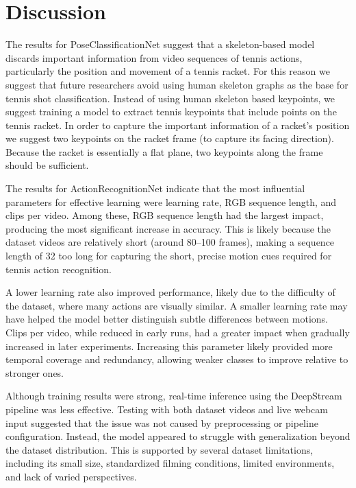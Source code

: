 \documentclass[pdflatex,sn-mathphys-num]{sn-jnl}%
\theoremstyle{thmstyleone}%
\theoremstyle{thmstyletwo}%
\theoremstyle{thmstylethree}%
\begin{document}


\section{Discussion}\label{sec5}

The results for PoseClassificationNet suggest that a skeleton-based model discards important information from video sequences of tennis actions, particularly the position and movement of a tennis racket. For this reason we suggest that future researchers avoid using human skeleton graphs as the base for tennis shot classification. Instead of using human skeleton based keypoints, we suggest training a model to extract tennis keypoints that include points on the tennis racket. In order to capture the important information of a racket's position we suggest two keypoints on the racket frame (to capture its facing direction). Because the racket is essentially a flat plane, two keypoints along the frame should be sufficient. 

The results for ActionRecognitionNet indicate that the most influential parameters for effective learning were learning rate, RGB sequence length, and clips per video. Among these, RGB sequence length had the largest impact, producing the most significant increase in accuracy. This is likely because the dataset videos are relatively short (around 80–100 frames), making a sequence length of 32 too long for capturing the short, precise motion cues required for tennis action recognition.

A lower learning rate also improved performance, likely due to the difficulty of the dataset, where many actions are visually similar. A smaller learning rate may have helped the model better distinguish subtle differences between motions. Clips per video, while reduced in early runs, had a greater impact when gradually increased in later experiments. Increasing this parameter likely provided more temporal coverage and redundancy, allowing weaker classes to improve relative to stronger ones.

Although training results were strong, real-time inference using the DeepStream pipeline was less effective. Testing with both dataset videos and live webcam input suggested that the issue was not caused by preprocessing or pipeline configuration. Instead, the model appeared to struggle with generalization beyond the dataset distribution. This is supported by several dataset limitations, including its small size, standardized filming conditions, limited environments, and lack of varied perspectives.
\end{document}
